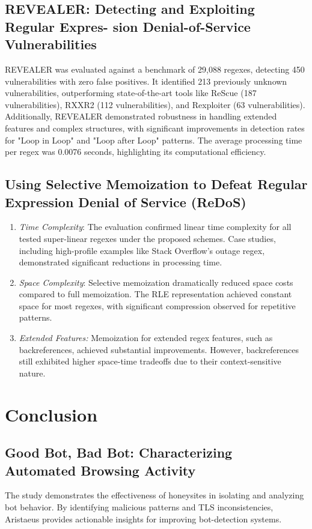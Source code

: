 \documentclass[conference]{IEEEtran}
\begin{document}
\subsection{\textbf{REVEALER: Detecting and Exploiting Regular Expres-
sion Denial-of-Service Vulnerabilities}}
REVEALER was evaluated against a benchmark of 29,088 regexes, detecting 450 vulnerabilities with zero false positives. It identified 213 previously unknown vulnerabilities, outperforming state-of-the-art tools like ReScue (187 vulnerabilities), RXXR2 (112 vulnerabilities), and Rexploiter (63 vulnerabilities). Additionally, REVEALER demonstrated robustness in handling extended features and complex structures, with significant improvements in detection rates for "Loop in Loop" and "Loop after Loop" patterns. The average processing time per regex was 0.0076 seconds, highlighting its computational efficiency.

\subsection{\textbf{Using Selective Memoization to Defeat Regular Expression Denial of Service (ReDoS)}}
\begin{enumerate}
    \item \textit{Time Complexity}: The evaluation confirmed linear time complexity for all tested super-linear regexes under the proposed schemes. Case studies, including high-profile examples like Stack Overflow's outage regex, demonstrated significant reductions in processing time.

    \item \textit{Space Complexity}: Selective memoization dramatically reduced space costs compared to full memoization. The RLE representation achieved constant space for most regexes, with significant compression observed for repetitive patterns.

    \item \textit{Extended Features:} Memoization for extended regex features, such as backreferences, achieved substantial improvements. However, backreferences still exhibited higher space-time tradeoffs due to their context-sensitive nature.

\end{enumerate}

\section{Conclusion}
\subsection{\textbf{Good Bot, Bad Bot: Characterizing Automated Browsing Activity}}
The study demonstrates the effectiveness of honeysites in isolating and analyzing bot behavior. By identifying malicious patterns and TLS inconsistencies, Aristaeus provides actionable insights for improving bot-detection systems.
\end{document}

